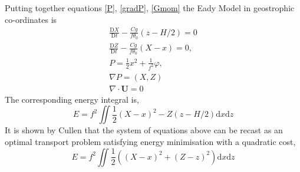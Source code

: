 Putting together equations \ref{P}, \ref{gradP}, \ref{Gmom} the Eady Model in geostrophic co-ordinates is 
\begin{equation}
	\begin{aligned}
		\frac{\mathrm{D}X}{\mathrm{D}t} -\frac{Cg}{f\theta _0}\left(z-H/2\right) = 0 \\
		\frac{\mathrm{D}Z}{\mathrm{D}t} - \frac{Cg}{f\theta_0}\left(X - x\right) = 0,\\
		P = \frac{1}{2}x^2 + \frac{1}{f^2}\varphi,\\
		\nabla P = (X,Z)\\
		\nabla \cdot \bm{U} = 0
	\end{aligned}
\label{EadyGC}
\end{equation}
The corresponding energy integral is,
\begin{equation}
E = f^2 \iint \frac{1}{2}\left(X-x\right)^2 - Z\left(z - H/2\right)\textrm{d}x\textrm{d}z
\label{energy}
\end{equation}
It is shown by Cullen \cite{Cullen2006a} that the system of equations above can be recast as an optimal transport problem satisfying energy minimisation with a quadratic cost,
\begin{equation}
E = f^2 \iint \frac{1}{2}\left(\left(X-x\right)^2 + \left(Z - z\right)^2\right)\textrm{d}x\textrm{d}z
\label{energy1}
\end{equation}
